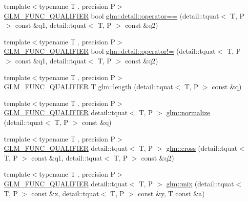 \begin{DoxyCompactItemize}
\item 
{\footnotesize template$<$typename T , precision P$>$ }\\\hyperlink{setup_8hpp_a33fdea6f91c5f834105f7415e2a64407}{G\+L\+M\+\_\+\+F\+U\+N\+C\+\_\+\+Q\+U\+A\+L\+I\+F\+I\+ER} bool \hyperlink{namespaceglm_1_1detail_aaa2da89669d53c8809c654fcba9ac875}{glm\+::detail\+::operator==} (detail\+::tquat$<$ T, P $>$ const \&q1, detail\+::tquat$<$ T, P $>$ const \&q2)
\item 
{\footnotesize template$<$typename T , precision P$>$ }\\\hyperlink{setup_8hpp_a33fdea6f91c5f834105f7415e2a64407}{G\+L\+M\+\_\+\+F\+U\+N\+C\+\_\+\+Q\+U\+A\+L\+I\+F\+I\+ER} bool \hyperlink{namespaceglm_1_1detail_a7a8bcff114f9833b09ab0da9af5232f1}{glm\+::detail\+::operator!=} (detail\+::tquat$<$ T, P $>$ const \&q1, detail\+::tquat$<$ T, P $>$ const \&q2)
\item 
{\footnotesize template$<$typename T , precision P$>$ }\\\hyperlink{setup_8hpp_a33fdea6f91c5f834105f7415e2a64407}{G\+L\+M\+\_\+\+F\+U\+N\+C\+\_\+\+Q\+U\+A\+L\+I\+F\+I\+ER} T \hyperlink{group__gtc__quaternion_ga3406ab83e2cafd4034f359957e942410}{glm\+::length} (detail\+::tquat$<$ T, P $>$ const \&q)
\item 
{\footnotesize template$<$typename T , precision P$>$ }\\\hyperlink{setup_8hpp_a33fdea6f91c5f834105f7415e2a64407}{G\+L\+M\+\_\+\+F\+U\+N\+C\+\_\+\+Q\+U\+A\+L\+I\+F\+I\+ER} detail\+::tquat$<$ T, P $>$ \hyperlink{group__gtc__quaternion_ga34ee289ca53a08207904e935104715d8}{glm\+::normalize} (detail\+::tquat$<$ T, P $>$ const \&q)
\item 
{\footnotesize template$<$typename T , precision P$>$ }\\\hyperlink{setup_8hpp_a33fdea6f91c5f834105f7415e2a64407}{G\+L\+M\+\_\+\+F\+U\+N\+C\+\_\+\+Q\+U\+A\+L\+I\+F\+I\+ER} detail\+::tquat$<$ T, P $>$ \hyperlink{namespaceglm_ad70062c675bba04acb6b067c448f6b9e}{glm\+::cross} (detail\+::tquat$<$ T, P $>$ const \&q1, detail\+::tquat$<$ T, P $>$ const \&q2)
\item 
{\footnotesize template$<$typename T , precision P$>$ }\\\hyperlink{setup_8hpp_a33fdea6f91c5f834105f7415e2a64407}{G\+L\+M\+\_\+\+F\+U\+N\+C\+\_\+\+Q\+U\+A\+L\+I\+F\+I\+ER} detail\+::tquat$<$ T, P $>$ \hyperlink{group__gtc__quaternion_gafabf175ae3e2cd30bf58dc313321955a}{glm\+::mix} (detail\+::tquat$<$ T, P $>$ const \&x, detail\+::tquat$<$ T, P $>$ const \&y, T const \&a)
\item 

\end{DoxyCompactItemize}
